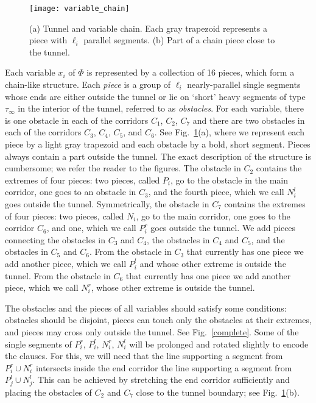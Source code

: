 \documentclass[11pt,a4paper]{article}
\begin{document}
\begin{figure}
\centering
\texttt{[image: variable\_chain]}
\caption{(a) Tunnel and variable chain. Each gray trapezoid represents a piece with $\ell_i$ parallel segments. (b) Part of a chain piece close to the tunnel.}
\label{chain}
\end{figure}

Each variable $x_i$ of $\Phi$ is represented by a collection of 16 pieces, which form a chain-like structure. Each \emph{piece} is a group of $\ell_i$ nearly-parallel single segments whose ends are either outside the tunnel or lie on `short' heavy segments of type $\tau_{\infty}$ in the interior of the tunnel, referred to as \emph{obstacles}. For each variable, there is one obstacle in each of the corridors $C_1$, $C_2$, $C_7$ and there are two obstacles in each of the corridors $C_3$, $C_4$, $C_5$, and $C_6$. See Fig.~\ref{chain}(a), where we represent each piece by a light gray trapezoid and each obstacle by a bold, short segment. Pieces always contain a part outside the tunnel. The exact description of the structure is cumbersome; we refer the reader to the figures. The obstacle in $C_2$ contains the extremes of four pieces: two pieces, called $P_i$, go to the obstacle in the main corridor, one goes to an obstacle in $C_3$, and the fourth piece, which we call $N_i^l$ goes outside the tunnel. Symmetrically, the obstacle in $C_7$ contains the extremes of four pieces: two pieces, called $N_i$, go to the main corridor, one goes to the corridor $C_6$, and one, which we call $P_i^r$ goes outside the tunnel. We add pieces connecting the obstacles in $C_3$ and $C_4$, the obstacles in  $C_4$ and $C_5$, and the obstacles in $C_5$ and $C_6$. From the obstacle in $C_3$ that currently has one piece we add another piece, which we call $P_i^l$ and whose other extreme is outside the tunnel. From the obstacle in $C_6$ that currently has one piece we add another piece, which we call $N_i^r$, whose other extreme is outside the tunnel. 

The obstacles and the pieces of all variables should satisfy some conditions: obstacles should be disjoint, pieces can touch only the obstacles at their extremes, and pieces may cross only outside the tunnel. See Fig.~\ref{complete}. Some of the single segments of $P_i^r$, $P_i^l$, $N_i^r$, $N_i^l$ will be prolonged and rotated slightly to encode the clauses. For this, we will need that the line supporting a segment from $P_i^r\cup N_i^r$ intersects inside the end corridor the line supporting a segment from $P_j^l\cup N_j^l$. This can be achieved by stretching the end corridor sufficiently and placing the obstacles of $C_2$ and $C_7$ close to the tunnel boundary; see Fig.~\ref{chain}(b).
\end{document}
